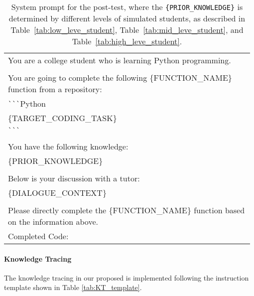 \begin{table}[th]
\renewcommand{\arraystretch}{0.95}
\begin{tabular}{p{0.98\linewidth}}
\toprule
\ttfamily \footnotesize You are a college student who is learning Python programming. \\
\ttfamily \footnotesize \\
\ttfamily \footnotesize You are going to complete the following \{FUNCTION\_NAME\} function from a repository: \\
\ttfamily \footnotesize \verb|```|Python \\
\ttfamily \footnotesize \{TARGET\_CODING\_TASK\} \\
\ttfamily \footnotesize \verb|```| \\
\ttfamily \footnotesize \\
\ttfamily \footnotesize You have the following knowledge: \\
\ttfamily \footnotesize \{PRIOR\_KNOWLEDGE\} \\
\ttfamily \footnotesize \\
\ttfamily \footnotesize Below is your discussion with a tutor: \\
\ttfamily \footnotesize \{DIALOGUE\_CONTEXT\} \\
\ttfamily \footnotesize \\
\ttfamily \footnotesize Please directly complete the \{FUNCTION\_NAME\} function based on the information above. \\
\ttfamily \footnotesize Completed Code: \\
\bottomrule
\end{tabular}
\caption{System prompt for the post-test, where the \texttt{\{PRIOR\_KNOWLEDGE\}} is determined by different levels of simulated students, as described in Table~\ref{tab:low_leve_student},  Table~\ref{tab:mid_leve_student}, and Table~\ref{tab:high_leve_student}.
}
\label{tab:posttest_template}
\end{table}




\paragraph{Knowledge Tracing}
\label{appendix:prompt_KT}


The knowledge tracing in our proposed \model is implemented following the instruction template shown in Table \ref{tab:KT_template}.

